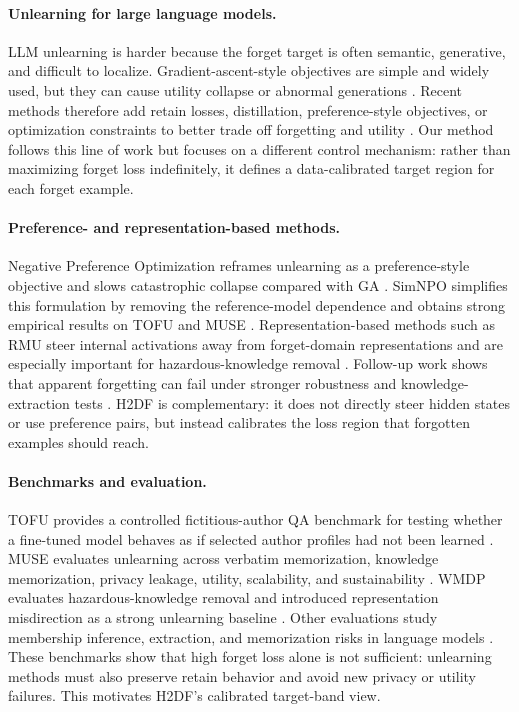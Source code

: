 \documentclass[10pt,twocolumn]{article}
\newcommand{\method}{\textsc{H2DF}}
\begin{document}
\paragraph{Unlearning for large language models.}
LLM unlearning is harder because the forget target is often semantic,
generative, and difficult to localize. Gradient-ascent-style objectives are
simple and widely used, but they can cause utility collapse or abnormal
generations \citep{yao2023large,zhang2024negative}. Recent methods therefore add
retain losses, distillation, preference-style objectives, or optimization
constraints to better trade off forgetting and utility
\citep{chen2023unlearn,liu2024rethinking,wang2024rkld,pan2024multiobjective}.
Our method follows this line of work but focuses on a different control
mechanism: rather than maximizing forget loss indefinitely, it defines a
data-calibrated target region for each forget example.

\paragraph{Preference- and representation-based methods.}
Negative Preference Optimization reframes unlearning as a preference-style
objective and slows catastrophic collapse compared with GA
\citep{zhang2024negative}. SimNPO simplifies this formulation by removing the
reference-model dependence and obtains strong empirical results on TOFU and MUSE
\citep{fan2024simplicity}. Representation-based methods such as RMU steer
internal activations away from forget-domain representations and are especially
important for hazardous-knowledge removal \citep{li2024wmdp}. Follow-up work
shows that apparent forgetting can fail under stronger robustness and
knowledge-extraction tests \citep{lynch2024eight}. \method{} is
complementary: it does not directly steer hidden states or use preference pairs,
but instead calibrates the loss region that forgotten examples should reach.

\paragraph{Benchmarks and evaluation.}
TOFU provides a controlled fictitious-author QA benchmark for testing whether a
fine-tuned model behaves as if selected author profiles had not been learned
\citep{maini2024tofu}. MUSE evaluates unlearning across verbatim memorization,
knowledge memorization, privacy leakage, utility, scalability, and sustainability
\citep{shi2024muse}. WMDP evaluates hazardous-knowledge removal and introduced
representation misdirection as a strong unlearning baseline \citep{li2024wmdp}.
Other evaluations study membership inference, extraction, and memorization risks
in language models \citep{carlini2021extracting,carlini2023quantifying,
mattern2023membership}. These benchmarks show that high forget loss alone is not
sufficient: unlearning methods must also preserve retain behavior and avoid new
privacy or utility failures. This motivates \method{}'s calibrated target-band
view.
\end{document}
